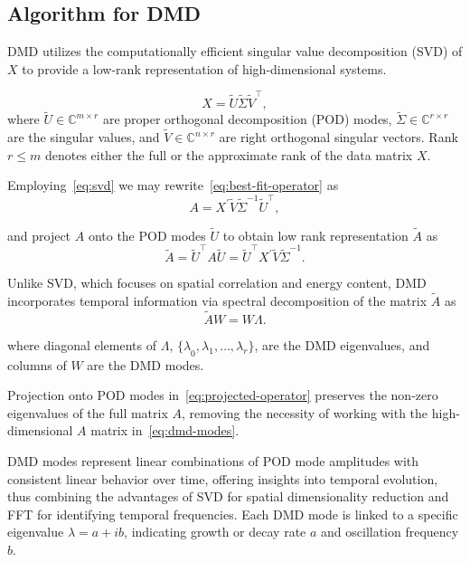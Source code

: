 \subsection{Algorithm for DMD}
DMD utilizes the computationally efficient singular value decomposition (SVD) of \(X\) to provide a low-rank representation of high-dimensional systems.

\begin{equation}\label{eq:svd}
    X = \tilde{U} \tilde{\Sigma} \tilde{V}^\top,
\end{equation}
where \(\tilde{U} \in \mathbb{C}^{m \times r}\) are proper orthogonal decomposition (POD) modes, \(\tilde{\Sigma} \in \mathbb{C}^{r \times r}\) are the singular values, and \( \tilde{V} \in \mathbb{C}^{n \times r}\) are right orthogonal singular vectors. Rank \(r \leq m\) denotes either the full or the approximate rank of the data matrix \(X\).

Employing~\eqref{eq:svd} we may rewrite~\eqref{eq:best-fit-operator} as
\begin{equation*}
    A = X^\prime \tilde{V} \tilde{\Sigma}^{-1} \tilde{U}^\top,
\end{equation*}

and project \(A\) onto the POD modes \(\tilde{U}\) to obtain low rank representation \(\tilde{A}\) as
\begin{equation}\label{eq:projected-operator}
    \tilde{A} = \tilde{U}^\top A \tilde{U} = \tilde{U}^\top X^\prime \tilde{V} \tilde{\Sigma}^{-1}.
\end{equation}

Unlike SVD, which focuses on spatial correlation and energy content, DMD incorporates temporal information via spectral decomposition of the matrix \(\tilde{A}\) as
\begin{equation}\label{eq:dmd-modes}
    \tilde{A} W = W \Lambda.
\end{equation}

where diagonal elements of \(\Lambda \), \({\{\lambda}_0, {\lambda}_1, \ldots, {\lambda}_r\} \), are the DMD eigenvalues, and columns of \(W\) are the DMD modes.

Projection onto POD modes in~\eqref{eq:projected-operator} preserves the non-zero eigenvalues of the full matrix \(A\), removing the necessity of working with the high-dimensional \(A\) matrix in~\eqref{eq:dmd-modes}.

DMD modes represent linear combinations of POD mode amplitudes with consistent linear behavior over time, offering insights into temporal evolution, thus combining the advantages of SVD for spatial dimensionality reduction and FFT for identifying temporal frequencies. Each DMD mode is linked to a specific eigenvalue \(\lambda = a + ib\), indicating growth or decay rate \(a\) and oscillation frequency \(b\).

